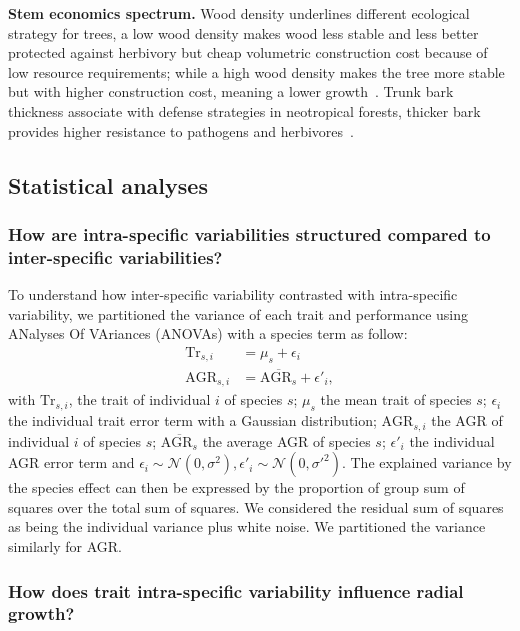 \textbf{Stem economics spectrum.} Wood density underlines different ecological strategy for trees, a low wood density makes wood less stable and less better protected against herbivory but cheap volumetric construction cost because of low resource requirements; while a high wood density makes the tree more stable but with higher construction cost, meaning a lower growth~\citep{chave_towards_2009}. Trunk bark thickness associate with defense strategies in neotropical forests, thicker bark provides higher resistance to pathogens and herbivores~\citep{paine_functional_2010}.

\subsection*{Statistical analyses}

\subsubsection*{How are intra-specific variabilities structured compared to inter-specific variabilities?}

To understand how inter-specific variability contrasted with intra-specific variability, we partitioned the variance of each trait and performance using ANalyses Of VAriances (ANOVAs) with a species term as follow:
\begin{subequations}
	\begin{align}
	\label{eq:anovatrait}
	\text{Tr}_{s, i} &= \mu_s + \epsilon_i\\
	\label{eq:anovaagr}
	\text{AGR}_{s, i} &= \overline{\text{AGR}_{s}} + \epsilon'_i,
	\end{align}
\end{subequations}
with $\text{Tr}_{s, i}$, the trait of individual $i$ of species $s$; $\mu_s$ the mean trait of species $s$; $\epsilon_i$ the individual trait error term with a Gaussian distribution; $\text{AGR}_{s, i}$ the AGR of individual $i$ of species $s$; $\overline{\text{AGR}_{s}}$ the average AGR of species $s$; $\epsilon'_i$ the individual AGR error term and $\epsilon_i \sim \mathcal{N}(0, \sigma^2), \epsilon'_i \sim \mathcal{N}(0, \sigma'^2)$. The explained variance by the species effect can then be expressed by the proportion of group sum of squares over the total sum of squares. We considered the residual sum of squares as being the individual variance plus white noise. We partitioned the variance similarly for AGR.

\subsubsection*{How does trait intra-specific variability influence radial growth?}

